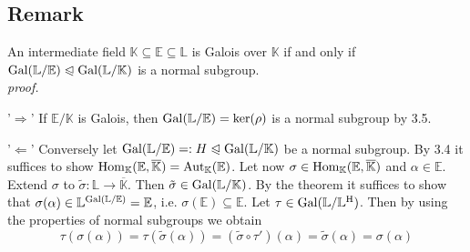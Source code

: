 \documentclass[12pt]{book}
\begin{document}
\begin{spacing}{1.3}
\subsection{Remark} %
An intermediate field $\mathbb{K} \subseteq \mathbb{E} \subseteq \mathbb{L}$ is Galois over $\mathbb{K}$ if and only if $\textrm{Gal}(\mathbb{L}/\mathbb{E}) \trianglelefteqslant \textrm{Gal}(\mathbb{L}/\mathbb{K})$ is a normal subgroup.\\
\textit{proof.}
\begin{compactenum}
\item['$\Rightarrow$'] If $\mathbb{E}/\mathbb{K}$ is Galois, then $\rm{Gal}(\mathbb{L}/\mathbb{E})=\ker(\rho)$ is a normal subgroup by 3.5.
\item['$\Leftarrow$']  Conversely let $\textrm{Gal}(\mathbb{L}/\mathbb{E})=:H \trianglelefteqslant \rm{Gal}(\mathbb{L}/\mathbb{K})$ be a normal subgroup. By 3.4 it suffices to show $\rm{Hom}_{\mathbb{K}}(\mathbb{E}, \overline{\mathbb{K}})=\rm{Aut}_{\mathbb{K}}(\mathbb{E})$. Let now $\sigma \in \rm{Hom}_{\mathbb{K}}(\mathbb{E}, \overline{\mathbb{K}})$ and $\alpha \in \mathbb{E}$. Extend $\sigma$ to $\tilde{\sigma}:\mathbb{L} \longrightarrow \overline{\mathbb{K}}$. Then $\tilde{\sigma} \in \rm{Gal}(\mathbb{L}/\mathbb{K})$. By the theorem it suffices to show that $\sigma(\alpha) \in \mathbb{L}^{\rm{Gal}(\mathbb{L}/\mathbb{E})}=\mathbb{E}$, i.e. $\sigma(\mathbb{E}) \subseteq \mathbb{E}$. Let $\tau \in \rm{Gal}(\mathbb{L}/\mathbb{L}^H)$. Then by using the properties of normal subgroups we obtain
$$ \tau\left(\sigma(\alpha)\right)= \tau\left(\tilde{\sigma}(\alpha)\right)=\left(\tilde{\sigma} \circ \tau'\right)(\alpha)= \tilde{\sigma}(\alpha)=\sigma(\alpha)$$

\end{compactenum}


\end{spacing}
\end{document}
